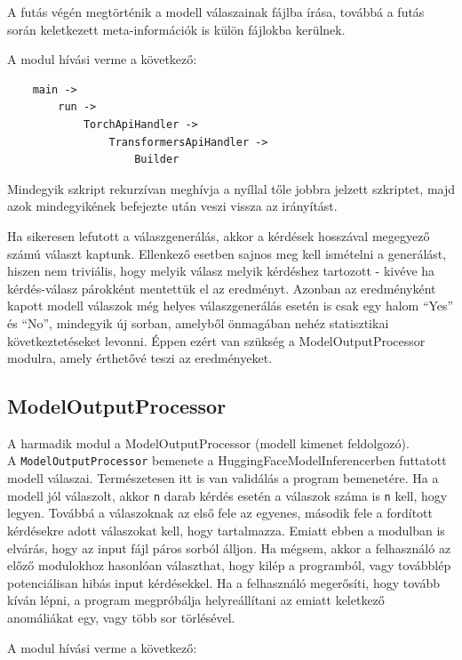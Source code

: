 \documentclass[12pt]{report}
\begin{document}
A futás végén megtörténik a modell válaszainak fájlba írása, továbbá a futás során keletkezett meta-információk is külön fájlokba kerülnek.

    A modul hívási verme a következő:

    \begin{verbatim}
    main ->
        run ->
            TorchApiHandler ->
                TransformersApiHandler ->
                    Builder
    \end{verbatim}
    Mindegyik szkript rekurzívan meghívja a nyíllal tőle jobbra jelzett szkriptet, majd azok mindegyikének befejezte után veszi vissza az irányítást.

    Ha sikeresen lefutott a válaszgenerálás, akkor a kérdések hosszával megegyező számú választ kaptunk. 
    Ellenkező esetben sajnos meg kell ismételni a generálást, hiszen nem triviális, hogy melyik válasz melyik kérdéshez tartozott - kivéve ha kérdés-válasz párokként mentettük el az eredményt. 
    Azonban az eredményként kapott modell válaszok még helyes válaszgenerálás esetén is csak egy halom ``Yes'' és ``No'', mindegyik új sorban, amelyből önmagában nehéz statisztikai következtetéseket levonni. 
    Éppen ezért van szükség a ModelOutputProcessor modulra, amely érthetővé teszi az eredményeket.

    \subsection{ModelOutputProcessor}
    A harmadik modul a ModelOutputProcessor (modell kimenet feldolgozó).\\
    A \texttt{\allowbreak ModelOutputProcessor} bemenete a HuggingFaceModelInferencerben futtatott modell válaszai.
    Természetesen itt is van validálás a program bemenetére.
    Ha a modell jól válaszolt, akkor \texttt{\allowbreak n} darab kérdés esetén a válaszok száma is \texttt{\allowbreak n} kell, hogy legyen.
    Továbbá a válaszoknak az első fele az egyenes, második fele a fordított kérdésekre adott válaszokat kell, hogy tartalmazza.
    Emiatt ebben a modulban is elvárás, hogy az input fájl páros sorból álljon.
    Ha mégsem, akkor a felhasználó az előző modulokhoz hasonlóan választhat, hogy kilép a programból, vagy továbblép potenciálisan hibás input kérdésekkel.
    Ha a felhasználó megerősíti, hogy tovább kíván lépni, a program megpróbálja helyreállítani az emiatt keletkező anomáliákat egy, vagy több sor törlésével.

    A modul hívási verme a következő:
\end{document}
